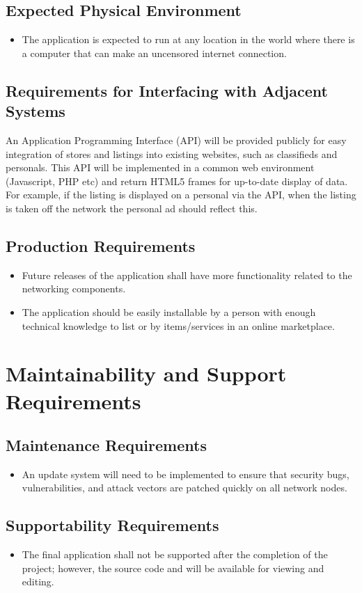 \documentclass{article}
\begin{document}
\subsection{Expected Physical Environment}
\begin{itemize}
 \item 
 The application is expected to run at any location in the world where there is a computer that can make an uncensored internet connection.
\end{itemize}
\subsection{Requirements for Interfacing with Adjacent Systems}
An Application Programming Interface (API) will be provided publicly for easy integration of stores and listings into existing websites, such as classifieds and personals. This API will be implemented in a common web environment (Javascript, PHP etc) and return HTML5 frames for up-to-date display of data. For example, if the listing is displayed on a personal via the API, when the listing is taken off the network the personal ad should reflect this.
\subsection{Production Requirements}
\begin{itemize}
\item
Future releases of the application shall have more functionality related to the networking components.
\item 
The application should be easily installable by a person with enough technical knowledge to list or by items/services in an online marketplace.
\end{itemize}
\section{Maintainability and Support Requirements}
\subsection{Maintenance Requirements}
\begin{itemize}
\item
An update system will need to be implemented to ensure that security bugs, vulnerabilities, and attack vectors are patched quickly on all network nodes. 
\end{itemize}

\subsection{Supportability Requirements}
\begin{itemize}
\item
The final application shall not be supported after the completion of the project; however, the source code and will be available for viewing and editing.
\end{itemize}
\end{document}

